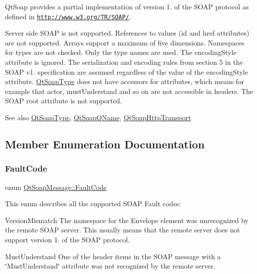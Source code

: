 Qt\+Soap provides a partial implementation of version 1. of the S\+O\+AP protocol as defined in  \href{http://www.w3.org/TR/SOAP/}{\tt http\+://www.\+w3.\+org/\+T\+R/\+S\+O\+A\+P/}.

Server side S\+O\+AP is not supported.  References to values (id and href attributes) are not supported.  Arrays support a maximum of five dimensions.  Namespaces for types are not checked. Only the type names are used.  The encoding\+Style attribute is ignored. The serialization and encoding rules from section 5 in the S\+O\+AP v1. specification are assumed regardless of the value of the encoding\+Style attribute.  \mbox{\hyperlink{class_qt_soap_type}{Qt\+Soap\+Type}} does not have accessors for attributes, which means for example that actor, must\+Understand and so on are not accessible in headers.  The S\+O\+AP root attribute is not supported. 

\begin{DoxySeeAlso}{See also}
\mbox{\hyperlink{class_qt_soap_type}{Qt\+Soap\+Type}}, \mbox{\hyperlink{class_qt_soap_q_name}{Qt\+Soap\+Q\+Name}}, \mbox{\hyperlink{class_qt_soap_http_transport}{Qt\+Soap\+Http\+Transport}} 
\end{DoxySeeAlso}


\subsection{Member Enumeration Documentation}
\mbox{\label{class_qt_soap_message_ad27765646a4612b1f644229e9544b744}} 
\subsubsection{\texorpdfstring{Fault\+Code}{FaultCode}}
{\footnotesize\ttfamily enum \mbox{\hyperlink{class_qt_soap_message_ad27765646a4612b1f644229e9544b744}{Qt\+Soap\+Message\+::\+Fault\+Code}}}

This enum describes all the supported S\+O\+AP Fault codes\+:

Version\+Mismatch The namespace for the Envelope element was unrecognized by the remote S\+O\+AP server. This usually means that the remote server does not support version 1. of the S\+O\+AP protocol.

Must\+Understand One of the header items in the S\+O\+AP message with a \char`\"{}\+Must\+Understand\char`\"{} attribute was not recognized by the remote server.

